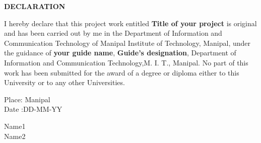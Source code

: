 \begin{center}
\large{\textbf{DECLARATION}}\\
\vspace{1cm}
\end{center}

I hereby declare that this project work entitled \textbf{Title of your project} is original and has been carried out by
me in the Department of Information and Communication Technology of Manipal Institute of Technology, Manipal, under the guidance of \textbf{your guide name}, \textbf{Guide's designation}, Department of Information and Communication Technology,M. I. T., Manipal. No part of this work has been submitted for the award of a degree or diploma either to this University or to any other Universities.



\vspace{2cm}

\begin{flushleft}
Place: Manipal\\
Date :DD-MM-YY
\end{flushleft}


\begin{flushright}
Name1\\
Name2
\end{flushright}